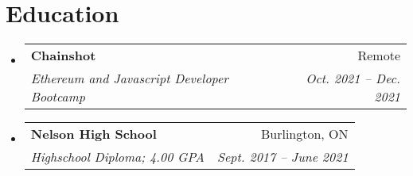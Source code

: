 \documentclass[letterpaper,11pt]{article}
\makeatletter
\newcommand{\resumeSubheading}[4]{
  \vspace{-2pt}\item
    \begin{tabular*}{0.97\textwidth}[t]{l@{\extracolsep{\fill}}r}
      \textbf{#1} & #2 \\
      \textit{\small#3} & \textit{\small #4} \\
    \end{tabular*}\vspace{-7pt}
}
\newcommand{\resumeSubHeadingListStart}{\begin{itemize}[leftmargin=0.15in, label={}]}
\newcommand{\resumeSubHeadingListEnd}{\end{itemize}}
\makeatother
\begin{document}
\section{Education}
\resumeSubHeadingListStart
  \resumeSubheading
    {Chainshot}{Remote}
    {Ethereum and Javascript Developer Bootcamp}{Oct. 2021 -- Dec. 2021}
  \resumeSubheading
    {Nelson High School}{Burlington, ON}
    {Highschool Diploma; 4.00 GPA}{Sept. 2017 -- June 2021}
\resumeSubHeadingListEnd

\end{document}
